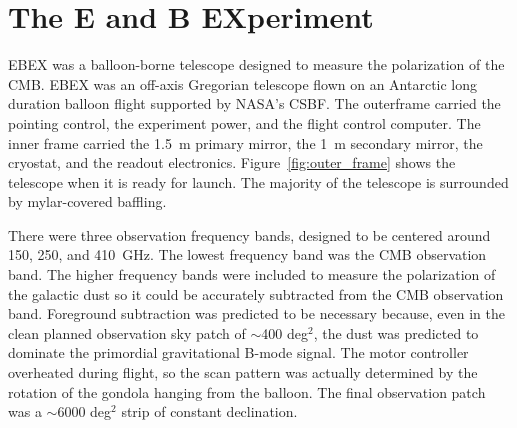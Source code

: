 \section{The E and B EXperiment}
\label{sec:ebex}

\ac{EBEX} was a balloon-borne telescope designed to measure the polarization of the \ac{CMB}.
\ac{EBEX} was an off-axis Gregorian
 telescope flown on an Antarctic long duration balloon flight supported by \ac{NASA}'s \ac{CSBF}. 
The outerframe carried the pointing control, the experiment power, and the flight control computer. 
The inner frame carried the 1.5~m primary mirror, the 1~m secondary mirror, the cryostat, and the readout electronics. 
Figure~\ref{fig:outer_frame} shows the telescope when it is ready for launch.
The majority of the telescope is surrounded by mylar-covered baffling. 




There were three observation frequency bands, designed to be centered around 150, 250, and 410~GHz. 
The lowest frequency band was the \ac{CMB} observation band. 
The higher frequency bands were included to measure the polarization of the galactic dust so it could be accurately subtracted from the \ac{CMB} observation band. 
Foreground subtraction was predicted to be necessary because, even in the clean planned observation sky patch of $\sim$400 deg$^2$, the dust was predicted to dominate the primordial gravitational B-mode signal. 
The motor controller overheated during flight, so the scan pattern was actually determined by the rotation of the gondola hanging from the balloon. 
The final observation patch was a $\sim$6000 deg$^2$ strip of constant declination.%


